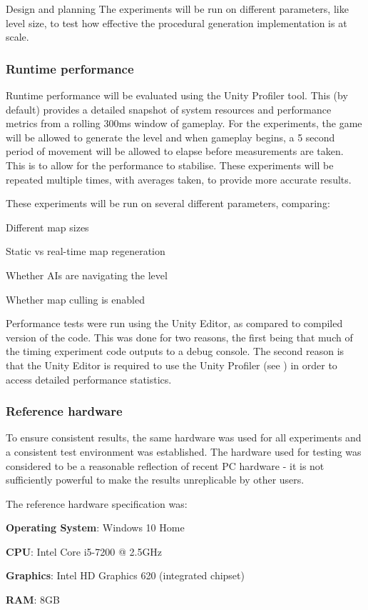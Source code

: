 \documentclass[final]{cmpreport}
\begin{document}
\begin{section}{Design and planning}
The experiments will be run on different parameters, like level size, to test how effective the procedural generation implementation is at scale.

\subsubsection{Runtime performance}
Runtime performance will be evaluated using the Unity Profiler tool. This (by default) provides a detailed snapshot of system resources and performance metrics from a rolling 300ms window of gameplay. For the experiments, the game will be allowed to generate the level and when gameplay begins, a 5 second period of movement will be allowed to elapse before measurements are taken. This is to allow for the performance to stabilise. These experiments will be repeated multiple times, with averages taken, to provide more accurate results.

These experiments will be run on several different parameters, comparing:

\begin{compactitem}
    \item{Different map sizes}
    \item{Static vs real-time map regeneration}
    \item{Whether AIs are navigating the level}
    \item{Whether map culling is enabled}
\end{compactitem}

Performance tests were run using the Unity Editor, as compared to compiled version of the code. This was done for two reasons, the first being that much of the timing experiment code outputs to a debug console. The second reason is that the Unity Editor is required to use the Unity Profiler (see \citet{technologies_2019}) in order to access detailed performance statistics.

\subsubsection{Reference hardware}
To ensure consistent results, the same hardware was used for all experiments and a consistent test environment was established. The hardware used for testing was considered to be a reasonable reflection of recent PC hardware - it is not sufficiently powerful to make the results unreplicable by other users.

The reference hardware specification was:
\begin{compactitem}
    \item{\textbf{Operating System}: Windows 10 Home}
    \item{\textbf{CPU}: Intel Core i5-7200 @ 2.5GHz}
    \item{\textbf{Graphics}: Intel HD Graphics 620 (integrated chipset)}
    \item{\textbf{RAM}: 8GB}
\end{compactitem}


\end{section}
\end{document}
